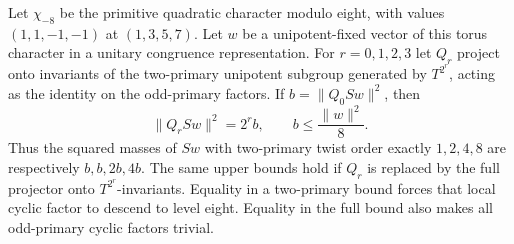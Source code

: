 \begin{proposition}
\label{prop:chi-eight-projection-ladder}
Let $\chi_{-8}$ be the primitive quadratic character modulo eight,
with values $(1,1,-1,-1)$ at $(1,3,5,7)$.  Let $w$ be a
unipotent-fixed vector of this torus character in a unitary congruence
representation.  For $r=0,1,2,3$ let $Q_r$ project onto invariants of
the two-primary unipotent subgroup generated by $T^{2^r}$, acting as
the identity on the odd-primary factors.  If $b=\|Q_0Sw\|^2$, then
\[
 \|Q_rSw\|^2=2^rb,\qquad b\leq\frac{\|w\|^2}{8}.
\]
Thus the squared masses of $Sw$ with two-primary twist order exactly
$1,2,4,8$ are respectively $b,b,2b,4b$.  The same upper bounds hold if
$Q_r$ is replaced by the full projector onto $T^{2^r}$-invariants.
Equality in a two-primary bound forces that local cyclic factor to
descend to level eight.  Equality in the full bound also makes all
odd-primary cyclic factors trivial.
\end{proposition}
